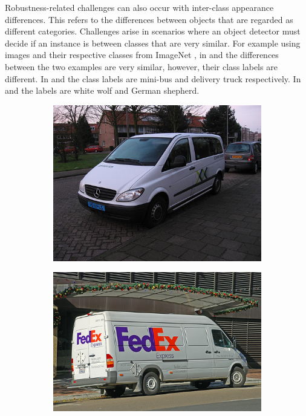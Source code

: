 Robustness-related challenges can also occur with inter-class appearance differences. This refers to the differences between objects that are regarded as different categories. Challenges arise in scenarios where an object detector must decide if an instance is between classes that are very similar. For example using images and their respective classes from ImageNet \cite{imagenet}, in  and  the differences between the two examples are very similar, however, their class labels are different. In  and  the class labels are mini-bus and delivery truck respectively. In  and  the labels are white wolf and German shepherd. 

\begin{figure}[H]
    \centering
    \begin{subfigure}[b]{0.45\textwidth}
        \center
        \includegraphics[width=\textwidth]{Figs/Problem/minibus.jpeg}
        \caption{}\label{fig:inter1a}
    \end{subfigure}
    \begin{subfigure}[b]{0.45\textwidth}
        \center
        \includegraphics[width=\textwidth]{Figs/Problem/deliverytruck.jpeg}

\end{subfigure}
\end{figure}
